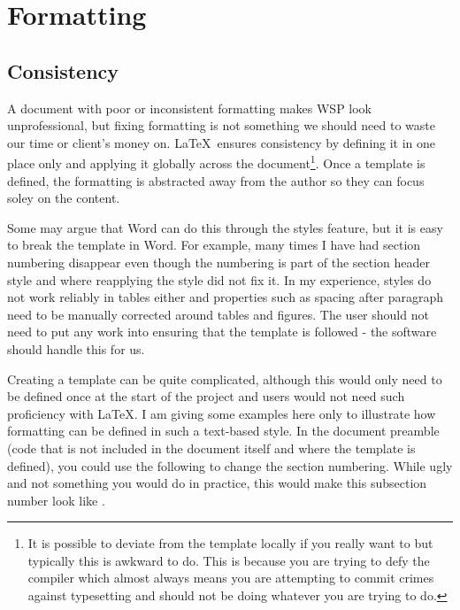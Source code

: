 \section{Formatting}
\label{sec:Formatting}

\subsection{Consistency}
\label{subsec:Consistency}

A document with poor or inconsistent formatting makes WSP look unprofessional, but fixing formatting is not something we should need to waste our time or client's money on. \LaTeX\ ensures consistency by defining it in one place only and applying it globally across the document\footnote{It is possible to deviate from the template locally if you really want to but typically this is awkward to do. This is because you are trying to defy the compiler which almost always means you are attempting to commit crimes against typesetting and should not be doing whatever you are trying to do.}. Once a template is defined, the formatting is abstracted away from the author so they can focus soley on the content.

Some may argue that Word can do this through the styles feature, but it is easy to break the template in Word. For example, many times I have had section numbering disappear even though the numbering is part of the section header style and where reapplying the style did not fix it. In my experience, styles do not work reliably in tables either and properties such as spacing after paragraph need to be manually corrected around tables and figures. The user should not need to put any work into ensuring that the template is followed - the software should handle this for us.

Creating a template can be quite complicated, although this would only need to be defined once at the start of the project and users would not need such proficiency with \LaTeX. I am giving some examples here only to illustrate how formatting can be defined in such a text-based style. In the document preamble (code that is not included in the document itself and where the template is defined), you could use the following to change the section numbering. While ugly and not something you would do in practice, this would make this subsection number look like {\unskip\unskip\thesubsection}.

\par
{}

